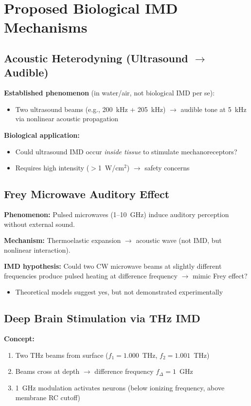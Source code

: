 \section{Proposed Biological IMD Mechanisms}

\subsection{Acoustic Heterodyning (Ultrasound $\rightarrow$ Audible)}

\textbf{Established phenomenon} (in water/air, not biological IMD per se):
\begin{itemize}
\item Two ultrasound beams (e.g., 200~kHz + 205~kHz) $\rightarrow$ audible tone at 5~kHz via nonlinear acoustic propagation
\end{itemize}

\textbf{Biological application:}
\begin{itemize}
\item Could ultrasound IMD occur \emph{inside tissue} to stimulate mechanoreceptors?
\item Requires high intensity ($>$1~W/cm$^2$) $\rightarrow$ safety concerns
\end{itemize}

\subsection{Frey Microwave Auditory Effect}

\textbf{Phenomenon:} Pulsed microwaves (1--10~GHz) induce auditory perception without external sound.

\textbf{Mechanism:} Thermoelastic expansion $\rightarrow$ acoustic wave (not IMD, but nonlinear interaction).

\textbf{IMD hypothesis:} Could two CW microwave beams at slightly different frequencies produce pulsed heating at difference frequency $\rightarrow$ mimic Frey effect?
\begin{itemize}
\item Theoretical models suggest yes, but not demonstrated experimentally
\end{itemize}

\subsection{Deep Brain Stimulation via THz IMD}

\textbf{Concept:}
\begin{enumerate}
\item Two THz beams from surface ($f_1 = 1.000$~THz, $f_2 = 1.001$~THz)
\item Beams cross at depth $\rightarrow$ difference frequency $f_{\Delta} = 1$~GHz
\item 1~GHz modulation activates neurons (below ionizing frequency, above membrane RC cutoff)
\end{enumerate}

